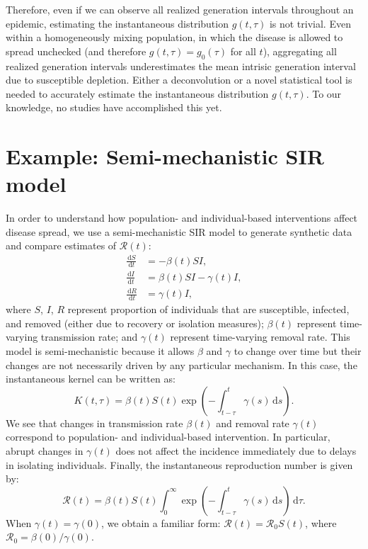 \documentclass[12pt]{article}
\newcommand{\Rx}[1]{\ensuremath{{\mathcal R}_{#1}}\xspace}
\newcommand{\Ro}{\Rx{0}}
\newcommand{\RR}{\ensuremath{{\mathcal R}}\xspace}
\newcommand{\dd}[1]{\ensuremath{\, \mathrm{d}#1}}
\newcommand{\dtau}{\dd{\tau}}
\begin{document}
Therefore, even if we can observe all realized generation intervals throughout an epidemic, estimating the instantaneous distribution $g(t, \tau)$ is not trivial.
Even within a homogeneously mixing population, in which the disease is allowed to spread unchecked (and therefore $g(t, \tau) = g_0(\tau)$ for all $t$), aggregating all realized generation intervals underestimates the mean intrisic generation interval due to susceptible depletion.
Either a deconvolution or a novel statistical tool is needed to accurately estimate the instantaneous distribution $g(t, \tau)$.
To our knowledge, no studies have accomplished this yet.

\section{Example: Semi-mechanistic SIR model}

In order to understand how population- and individual-based interventions affect disease spread, we use a semi-mechanistic SIR model to generate synthetic data and compare estimates of $\RR(t)$:
\begin{align}
\frac{\dd{S}}{\dd{t}} &= - \beta(t)S I,\\
\frac{\dd{I}}{\dd{t}} &= \beta(t)S I - \gamma(t) I,\\
\frac{\dd{R}}{\dd{t}} &= \gamma(t) I,
\end{align}
where $S$, $I$, $R$ represent proportion of individuals that are susceptible, infected, and removed (either due to recovery or isolation measures);
$\beta(t)$ represent time-varying transmission rate; and $\gamma(t)$ represent time-varying removal rate.
This model is semi-mechanistic because it allows $\beta$ and $\gamma$ to change over time but their changes are not necessarily driven by any particular mechanism.
In this case, the instantaneous kernel can be written as:
\begin{equation}
K(t, \tau) = \beta(t) S(t) \exp\left(-\int_{t-\tau}^t \gamma(s) \dd{s} \right).
\end{equation}
We see that changes in transmission rate $\beta(t)$ and removal rate $\gamma(t)$ correspond to population- and individual-based intervention.
In particular, abrupt changes in $\gamma(t)$ does not affect the incidence immediately due to delays in isolating individuals.
Finally, the instantaneous reproduction number is given by:
\begin{equation}
\RR(t) = \beta(t) S(t) \int_0^\infty \exp\left(-\int_{t-\tau}^t \gamma(s) \dd{s} \right) \dtau.
\end{equation}
When $\gamma(t) = \gamma(0)$, we obtain a familiar form: $\RR(t) = \Ro S(t)$,
where $\Ro = \beta(0)/\gamma(0)$.
\end{document}
